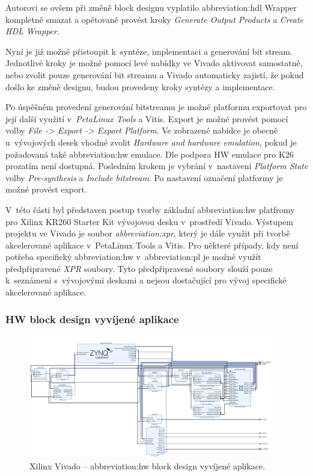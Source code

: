 \documentclass[a4paper, twoside, 11pt]{article}
\newcommand{\fbar}{\FloatBarrier}
\begin{document}
				Autorovi se ovšem při změně block designu vyplatilo \gls{abbreviation:hdl} Wrapper kompletně smazat a opětovaně provést kroky \textit{Generate Output Products} a \textit{Create HDL Wrapper}.\par
				Nyní je již možné přistoupit k~syntéze, implementaci a generování bit stream. Jednotlivé kroky je možné pomocí levé nabídky ve Vivado aktivovat samostatně, nebo zvolit pouze generování bit streamu a Vivado automaticky zajistí, že pokud došlo ke změně designu, budou provedeny kroky syntézy a implementace.\par
				Po úspěšném provedení generování bitstreamu je možné platformu exportovat pro její další využití v~\textit{PetaLinux Tools} a Vitis. Export je možné provést pomocí volby \textit{File -> Export -> Export Platform}. Ve zobrazené nabídce je obecně u~vývojových desek vhodné zvolit \textit{Hardware and hardware emulation}, pokud je požadovaná také \gls{abbreviation:hw} emulace. Dle \cite{hackster-add-peripherial-support-to-kria-kr260-vivado} podpora HW emulace pro K26 prozatím není dostupná. Posledním krokem je vybrání v~nastavení \textit{Platform State} volby \textit{Pre-synthesis} a \textit{Include bitstream}. Po nastavení označení platformy je možné provést export.\par
				V~této části byl představen postup tvorby základní \gls{abbreviation:hw} platfromy pro Xilinx KR260 Starter Kit vývojovou desku v~prostředí Vivado. Výstupem projektu ve Vivado je soubor \textit{\gls{abbreviation:xpr}}, který je dále využit při tvorbě akcelerované aplikace v~PetaLinux Tools a Vitis. Pro některé případy, kdy není potřeba specifický \gls{abbreviation:hw} v~\gls{abbreviation:pl} je možné využít předpřipravené \textit{XPR} soubory. Tyto předpřipravené soubory slouží pouze k~seznámení s~vývojovými deskami a nejsou dostačující pro vývoj specifické akcelerované aplikace.
				
			\fbar
			\subsubsection{HW block design vyvíjené aplikace}\label{subsubsec:hw-block-design-vyvijene-aplikace}

			\begin{figure}[htbp!]
				\centering
				\includegraphics[width=0.95\textwidth]{src/png/kr-26-xilinx-vivado-hw-block-design.png}
				\caption{Xilinx Vivado – \gls{abbreviation:hw} block design vyvíjené aplikace.}
				\label{fig:kr-26-xilinx-vivado-hw-block-design}
			\end{figure}
\end{document}
